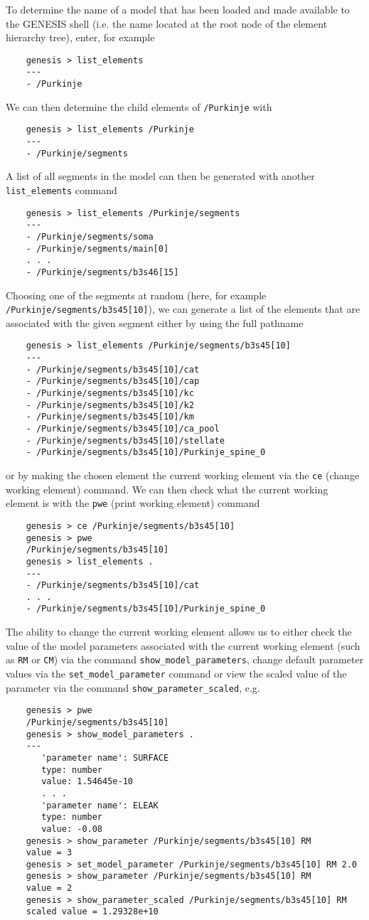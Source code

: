 \documentclass[12pt]{article}
\begin{document}
To determine the name of a model that has been loaded and made available to the GENESIS shell (i.e. the name located at the root node of the element hierarchy tree), enter, for example 
\begin{verbatim}
    genesis > list_elements
    ---
    - /Purkinje
\end{verbatim}
We can then determine the child elements of {\tt /Purkinje} with
\begin{verbatim}
    genesis > list_elements /Purkinje
    ---
    - /Purkinje/segments
\end{verbatim}
A list of all segments in the model can then be generated with another {\tt list\_elements} command
\begin{verbatim}
    genesis > list_elements /Purkinje/segments
    ---
    - /Purkinje/segments/soma
    - /Purkinje/segments/main[0]
    . . .
    - /Purkinje/segments/b3s46[15]
\end{verbatim}
Choosing one of the segments at random (here, for example {\tt /Purkinje/segments/b3s45[10]}), we can generate a list of the elements that are associated with the given segment either by using the full pathname
\begin{verbatim}
    genesis > list_elements /Purkinje/segments/b3s45[10]
    ---
    - /Purkinje/segments/b3s45[10]/cat
    - /Purkinje/segments/b3s45[10]/cap
    - /Purkinje/segments/b3s45[10]/kc
    - /Purkinje/segments/b3s45[10]/k2
    - /Purkinje/segments/b3s45[10]/km
    - /Purkinje/segments/b3s45[10]/ca_pool
    - /Purkinje/segments/b3s45[10]/stellate
    - /Purkinje/segments/b3s45[10]/Purkinje_spine_0
\end{verbatim}
or by making the chosen element the current working element via the {\tt ce} (change working element) command. We can then check what the current working element is with the {\tt pwe} (print working element) command
\begin{verbatim}
    genesis > ce /Purkinje/segments/b3s45[10]
    genesis > pwe
    /Purkinje/segments/b3s45[10]
    genesis > list_elements .
    ---
    - /Purkinje/segments/b3s45[10]/cat
    . . .
    - /Purkinje/segments/b3s45[10]/Purkinje_spine_0
\end{verbatim}
The ability to change the current working element allows us to either check the value of the model parameters associated with the current working element (such as {\tt RM} or {\tt CM}) via the command {\tt show\_model\_parameters}, change default parameter values via the {\tt set\_model\_parameter} command or view the scaled value of the parameter via the command {\tt show\_parameter\_scaled}, e.g.
\begin{verbatim}
    genesis > pwe
    /Purkinje/segments/b3s45[10]
    genesis > show_model_parameters .
    ---
       'parameter name': SURFACE
       type: number
       value: 1.54645e-10
       . . .
       'parameter name': ELEAK
       type: number
       value: -0.08
    genesis > show_parameter /Purkinje/segments/b3s45[10] RM
    value = 3    
    genesis > set_model_parameter /Purkinje/segments/b3s45[10] RM 2.0
    genesis > show_parameter /Purkinje/segments/b3s45[10] RM
    value = 2
    genesis > show_parameter_scaled /Purkinje/segments/b3s45[10] RM
    scaled value = 1.29328e+10
\end{verbatim}
\end{document}
